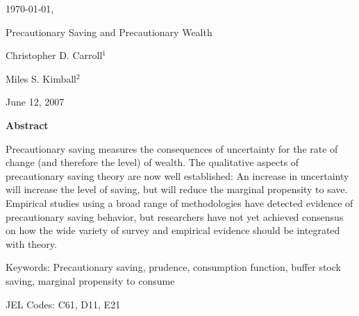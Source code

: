 \documentclass[12pt,letterpaper]{econtex}
\begin{document}
\begin{titlepage}

  \enlargethispage{3000pt}

  \hfill{\tiny \today, \jobname}



  \vspace{0.2in}

  \centerline{\LARGE Precautionary Saving and Precautionary Wealth}

  \vspace{.2in}

  \normalsize

  \centerline{\Large Christopher D. Carroll$^1$}
  
  \medskip\medskip
  \centerline{\Large Miles S. Kimball$^2$}
  
  \medskip
  \medskip


  \centerline{June 12, 2007}

  \vspace{.2in}

  \centerline{\bf Abstract}
  \normalsize

  Precautionary saving measures the consequences of uncertainty for the
  rate of change (and therefore the level) of wealth.  The qualitative
  aspects of precautionary saving theory are now well established: An
  increase in uncertainty will increase the level of saving, but will
  reduce the marginal propensity to save.  Empirical studies using a
  broad range of methodologies have detected evidence of precautionary
  saving behavior, but researchers have not yet achieved consensus on
  how the wide variety of survey and empirical evidence should be
  integrated with theory.

  \vspace{0.2in}

  \noindent Keywords: Precautionary saving, prudence, consumption function, buffer stock saving, 
  marginal propensity to consume
  \medskip\medskip

  \noindent JEL Codes: C61, D11, E21

  \medskip




\end{titlepage}
\end{document}
